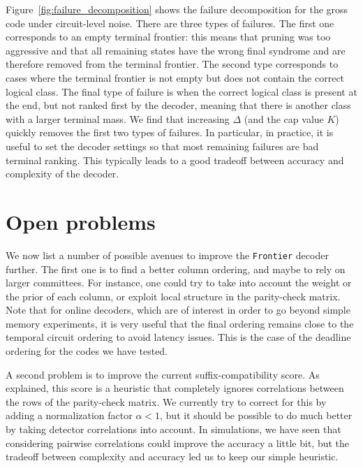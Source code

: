 \documentclass[a4paper,twocolumn,11pt,unpublished]{quantumarticle}
\newcommand{\frontier}{\texttt{Frontier}}
\begin{document}
Figure~\ref{fig:failure_decomposition} shows the failure decomposition for the gross code under circuit-level noise. 
There are three types of failures. The first one corresponds to an empty terminal frontier: this means that pruning was too aggressive and that all remaining states have the wrong final syndrome and are therefore removed from the terminal frontier. The second type corresponds to cases where the terminal frontier is not empty but does not contain the correct logical class. The final type of failure is when the correct logical class is present at the end, but not ranked first by the decoder, meaning that there is another class with a larger terminal mass. 
We find that increasing $\Delta$ (and the cap value $K$) quickly removes the first two types of failures. In particular, in practice, it is useful to set the decoder settings so that most remaining failures are bad terminal ranking. This typically leads to a good tradeoff between accuracy and complexity of the decoder.


\FloatBarrier

\section{Open problems}
\label{sec:problems}

We now list a number of possible avenues to improve the \frontier{} decoder further. 
The first one is to find a better column ordering, and maybe to rely on larger committees. For instance, one could try to take into account the weight or the prior of each column, or exploit local structure in the parity-check matrix. 
Note that for online decoders, which are of interest in order to go beyond simple memory experiments, it is very useful that the final ordering remains close to the temporal circuit ordering to avoid latency issues. This is the case of the deadline ordering for the codes we have tested. 

A second problem is to improve the current suffix-compatibility score. As explained, this score is a heuristic that completely ignores correlations between the rows of the parity-check matrix. We currently try to correct for this by adding a normalization factor $\alpha <1$, but it should be possible to do much better by taking detector correlations into account. In simulations, we have seen that considering pairwise correlations could improve the accuracy a little bit, but the tradeoff between complexity and accuracy led us to keep our simple heuristic. 
\end{document}
